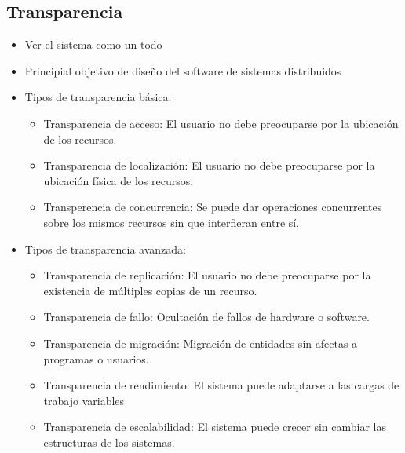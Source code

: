 \subsection{Transparencia}
\begin{itemize}
    \item Ver el sistema como un todo
    \item Principial objetivo de diseño del software de sistemas distribuidos
    \item Tipos de transparencia básica:
    \begin{itemize}
        \item Transparencia de acceso: El usuario no debe preocuparse por la ubicación de los recursos.
        \item Transparencia de localización: El usuario no debe preocuparse por la ubicación física de los recursos.    
        \item Transperencia de concurrencia: Se puede dar operaciones concurrentes sobre los mismos recursos sin que interfieran entre sí.
    \end{itemize}
    \item Tipos de transparencia avanzada:
    \begin{itemize}
        \item Transparencia de replicación: El usuario no debe preocuparse por la existencia de múltiples copias de un recurso.
        \item Transparencia de fallo: Ocultación de fallos de hardware o software.
        \item Transparencia de migración: Migración de entidades sin afectas a programas o usuarios.
        \item Transparencia de rendimiento: El sistema puede adaptarse a las cargas de trabajo variables
        \item Transparencia de escalabilidad: El sistema puede crecer sin cambiar las estructuras de los sistemas.
    \end{itemize}
    
\end{itemize}

